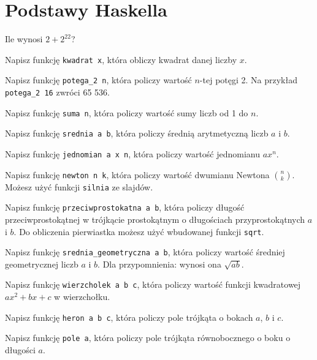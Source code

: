 \section{Podstawy Haskella}
\begin{questions}
  \item {
    Ile wynosi $2+2^{22}$?
  }
  \item {
    Napisz funkcję \texttt{kwadrat x}, która obliczy kwadrat danej liczby $x$.
  }
  \item {
    Napisz funkcję \texttt{potega\_2 n}, która policzy wartość $n$-tej
    potęgi 2. Na przykład \texttt{potega\_2 16} zwróci 65 536.
  }
  \item {
    Napisz funkcję \texttt{suma n}, która policzy wartość sumy liczb od 1 do $n$.
  }
  \item {
    Napisz funkcję \texttt{srednia a b}, która policzy średnią arytmetyczną
    liczb $a$ i $b$.
  }
  \item {
    Napisz funkcję \texttt{jednomian a x n}, która policzy wartość jednomianu
    $ax^n$.
  }
  \item {
    Napisz funkcję \texttt{newton n k}, która policzy wartość dwumianu Newtona
    $n \choose k$. Możesz użyć funkcji \texttt{silnia} ze slajdów.
  }
  \item {
    Napisz funkcję \texttt{przeciwprostokatna a b}, która policzy długość
    przeciwprostokątnej w trójkącie prostokątnym o długościach przyprostokątnych
    $a$ i $b$. Do obliczenia pierwiastka możesz użyć wbudowanej funkcji
    \texttt{sqrt}.
  }
  \item {
    Napisz funkcję \texttt{srednia\_geometryczna a b}, która policzy wartość
    średniej geometrycznej liczb $a$ i $b$. Dla przypomnienia: wynosi ona
    $\sqrt{ab}$.
  }
  \item {
    Napisz funkcję \texttt{wierzcholek a b c}, która policzy wartość funkcji
    kwadratowej $ax^2 + bx + c$ w wierzchołku.
  }
  \item {
    Napisz funkcję \texttt{heron a b c}, która policzy pole trójkąta o bokach
    $a$, $b$ i $c$.
  }
  \item {
    Napisz funkcję \texttt{pole a}, która policzy pole trójkąta równobocznego
    o boku o długości $a$.
  }
\end{questions}
